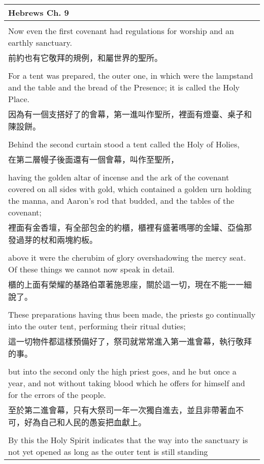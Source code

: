 \documentclass{book}
\begin{document}
\newpage
\begin{tabularx}{\textwidth}{p{}}
\hline
Hebrews Ch. 9 \\
\hline \\
Now even the first covenant had regulations for worship and an earthly sanctuary. \\
前約也有它敬拜的規例，和屬世界的聖所。 \\ \\
For a tent was prepared, the outer one, in which were the lampstand and the table and the bread of the Presence; it is called the Holy Place. \\
因為有一個支搭好了的會幕，第一進叫作聖所，裡面有燈臺、桌子和陳設餅。 \\ \\
Behind the second curtain stood a tent called the Holy of Holies, \\
在第二層幔子後面還有一個會幕，叫作至聖所， \\ \\
having the golden altar of incense and the ark of the covenant covered on all sides with gold, which contained a golden urn holding the manna, and Aaron's rod that budded, and the tables of the covenant; \\
裡面有金香壇，有全部包金的約櫃，櫃裡有盛著嗎哪的金罐、亞倫那發過芽的杖和兩塊約板。 \\ \\
above it were the cherubim of glory overshadowing the mercy seat. Of these things we cannot now speak in detail. \\
櫃的上面有榮耀的基路伯罩著施恩座，關於這一切，現在不能一一細說了。 \\ \\
These preparations having thus been made, the priests go continually into the outer tent, performing their ritual duties; \\
這一切物件都這樣預備好了，祭司就常常進入第一進會幕，執行敬拜的事。 \\ \\
but into the second only the high priest goes, and he but once a year, and not without taking blood which he offers for himself and for the errors of the people. \\
至於第二進會幕，只有大祭司一年一次獨自進去，並且非帶著血不可，好為自己和人民的愚妄把血獻上。 \\ \\
By this the Holy Spirit indicates that the way into the sanctuary is not yet opened as long as the outer tent is still standing \\

\end{tabularx}
\end{document}
